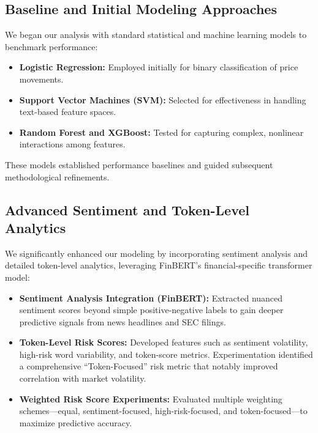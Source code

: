 \documentclass[twocolumn]{article}
\begin{document}
\subsection{Baseline and Initial Modeling Approaches}
We began our analysis with standard statistical and machine learning models to benchmark performance:
\begin{itemize}
    \item \textbf{Logistic Regression:} Employed initially for binary classification of price movements.
    \item \textbf{Support Vector Machines (SVM):} Selected for effectiveness in handling text-based feature spaces.
    \item \textbf{Random Forest and XGBoost:} Tested for capturing complex, nonlinear interactions among features.
\end{itemize}

These models established performance baselines and guided subsequent methodological refinements.

\subsection{Advanced Sentiment and Token-Level Analytics}
We significantly enhanced our modeling by incorporating sentiment analysis and detailed token-level analytics, leveraging FinBERT's financial-specific transformer model:
\begin{itemize}
    \item \textbf{Sentiment Analysis Integration (FinBERT):} Extracted nuanced sentiment scores beyond simple positive-negative labels to gain deeper predictive signals from news headlines and SEC filings.
    \item \textbf{Token-Level Risk Scores:} Developed features such as sentiment volatility, high-risk word variability, and token-score metrics. Experimentation identified a comprehensive “Token-Focused” risk metric that notably improved correlation with market volatility.
    \item \textbf{Weighted Risk Score Experiments:} Evaluated multiple weighting schemes—equal, sentiment-focused, high-risk-focused, and token-focused—to maximize predictive accuracy.
\end{itemize}
\end{document}
